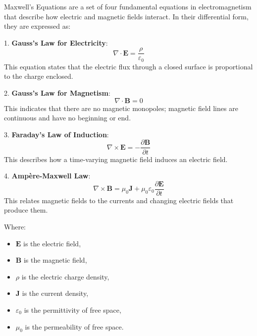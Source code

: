 \documentclass{article}
\begin{document}
Maxwell's Equations are a set of four fundamental equations in electromagnetism that describe how electric and magnetic fields interact. In their differential form, they are expressed as:

1. \textbf{Gauss's Law for Electricity}:
\[
\nabla \cdot \mathbf{E} = \frac{\rho}{\varepsilon_0}
\]
This equation states that the electric flux through a closed surface is proportional to the charge enclosed.

2. \textbf{Gauss's Law for Magnetism}:
\[
\nabla \cdot \mathbf{B} = 0
\]
This indicates that there are no magnetic monopoles; magnetic field lines are continuous and have no beginning or end.

3. \textbf{Faraday's Law of Induction}:
\[
\nabla \times \mathbf{E} = -\frac{\partial \mathbf{B}}{\partial t}
\]
This describes how a time-varying magnetic field induces an electric field.

4. \textbf{Ampère-Maxwell Law}:
\[
\nabla \times \mathbf{B} = \mu_0 \mathbf{J} + \mu_0 \varepsilon_0 \frac{\partial \mathbf{E}}{\partial t}
\]
This relates magnetic fields to the currents and changing electric fields that produce them.

Where:
\begin{itemize}
  \item $\mathbf{E}$ is the electric field,
  \item $\mathbf{B}$ is the magnetic field,
  \item $\rho$ is the electric charge density,
  \item $\mathbf{J}$ is the current density,
  \item $\varepsilon_0$ is the permittivity of free space,
  \item $\mu_0$ is the permeability of free space.
\end{itemize}
\end{document}
